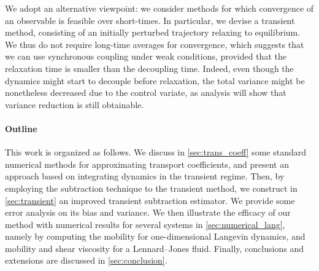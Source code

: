 We adopt an alternative viewpoint: we consider methods for which convergence of an observable is feasible over short-times. In particular, we devise a transient method, consisting of an initially perturbed trajectory relaxing to equilibrium. We thus do not require long-time averages for convergence, 
which suggests that we can use synchronous coupling under weak conditions, provided that the relaxation time is smaller than the decoupling time. Indeed, even though the dynamics might start to decouple before relaxation, the total variance might be nonetheless decreased due to the control variate, as analysis will show that variance reduction is still obtainable.

\paragraph{Outline} This work is organized as follows. We discuss in \cref{sec:trans_coeff} some standard numerical methods for approximating transport coefficients, and present an approach based on integrating dynamics in the transient regime. Then, by employing the subtraction technique to the transient method, we construct in \cref{sec:transient} an improved transient subtraction estimator. We provide some error analysis on its bias and variance. We then illustrate the efficacy of our method with numerical results for several systems in \cref{sec:numerical_lang}, namely by computing the mobility for one-dimensional Langevin dynamics, and mobility and shear viscosity for a Lennard--Jones fluid. Finally, conclusions and extensions are discussed in \cref{sec:conclusion}.